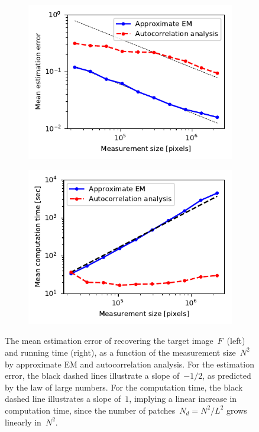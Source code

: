 \documentclass{article}
\begin{document}
\begin{figure}[!tb]
	\begin{subfigure}[ht]{.5\columnwidth}
		\centering
		\includegraphics[width=1\columnwidth]{figures/experiment_size_err.pdf}
	\end{subfigure}
	\begin{subfigure}[ht]{.5\columnwidth}
		\centering
		\includegraphics[width=1\columnwidth]{figures/experiment_size_time.pdf}
	\end{subfigure}
	\caption{The mean estimation error of recovering the target image~$F$~(left) and running time (right), as a function of the measurement size~$N^2$ by approximate EM and autocorrelation analysis. For the estimation error, the black dashed lines illustrate a slope of~$-1/2$, as predicted by the law of large numbers. For the computation time, the black dashed line illustrates a slope of~$1$, implying a linear increase in computation time, since the number of patches~\mbox{$N_d = N^2 / L^2$} grows linearly in~$N^2$.}
\label{fig:size_experiment}
\end{figure}
\end{document}
